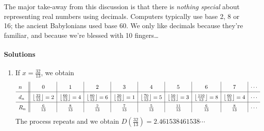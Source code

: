 The major take-away from this discussion is that there is \emph{nothing special} about representing real numbers using decimals. Computers typically use base 2, 8 or 16; the ancient Babylonians used base 60. We only like decimals because they're familiar, and because we're blessed with 10 fingers\ldots 


\newpage

\paragraph{Solutions}

\begin{enumerate}
  \item If $x=\frac{32}{13}$, we obtain
  \[\def\arraystretch{1.5}\begin{array}{l||c|c|c|c|c|c|c|c|c}
  	n&0&1&2&3&4&5&6&7&\cdots\\\hline
  	d_n&\left\lfloor\frac{32}{13}\right\rfloor=2 &\left\lfloor\frac{60}{13}\right\rfloor=4 &\left\lfloor\frac{80}{13}\right\rfloor=6 &\left\lfloor\frac{20}{13}\right\rfloor=1 &\left\lfloor\frac{70}{13}\right\rfloor=5 &\left\lfloor\frac{50}{13}\right\rfloor=3 &\left\lfloor\frac{110}{13}\right\rfloor=8 &\left\lfloor\frac{60}{13}\right\rfloor=4&\cdots\\\hline
  	R_n&\frac 6{13} &\frac 8{13} &\frac 2{13} &\frac 7{13} &\frac 5{13} &\frac{11}{13} &\frac{6}{13} &\frac 8{13} &\cdots
  \end{array}\]
  The process repeats and we obtain $D(\frac{32}{13})=2.461538461538\cdots$
  

\end{enumerate}
